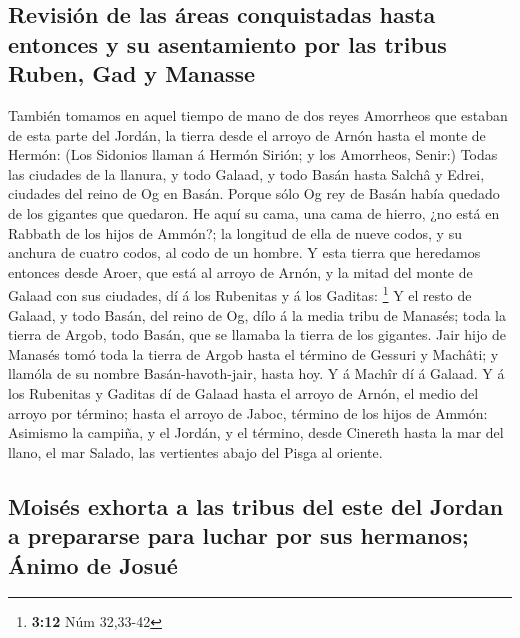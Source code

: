 \hypertarget{revisiuxf3n-de-las-uxe1reas-conquistadas-hasta-entonces-y-su-asentamiento-por-las-tribus-ruben-gad-y-manasse}{%
\subsection{Revisión de las áreas conquistadas hasta entonces y su
asentamiento por las tribus Ruben, Gad y
Manasse}\label{revisiuxf3n-de-las-uxe1reas-conquistadas-hasta-entonces-y-su-asentamiento-por-las-tribus-ruben-gad-y-manasse}}

 También tomamos en aquel tiempo de mano de dos reyes
Amorrheos que estaban de esta parte del Jordán, la tierra desde el
arroyo de Arnón hasta el monte de Hermón:  (Los Sidonios
llaman á Hermón Sirión; y los Amorrheos, Senir:)  Todas las
ciudades de la llanura, y todo Galaad, y todo Basán hasta Salchâ y
Edrei, ciudades del reino de Og en Basán.  Porque sólo Og
rey de Basán había quedado de los gigantes que quedaron. He aquí su
cama, una cama de hierro, ¿no está en Rabbath de los hijos de Ammón?; la
longitud de ella de nueve codos, y su anchura de cuatro codos, al codo
de un hombre.  Y esta tierra que heredamos entonces desde
Aroer, que está al arroyo de Arnón, y la mitad del monte de Galaad con
sus ciudades, dí á los Rubenitas y á los Gaditas: \footnote{\textbf{3:12}
  Núm 32,33-42}  Y el resto de Galaad, y todo Basán, del
reino de Og, dílo á la media tribu de Manasés; toda la tierra de Argob,
todo Basán, que se llamaba la tierra de los gigantes.  Jair
hijo de Manasés tomó toda la tierra de Argob hasta el término de Gessuri
y Machâti; y llamóla de su nombre Basán-havoth-jair, hasta hoy.
 Y á Machîr dí á Galaad.  Y á los Rubenitas y
Gaditas dí de Galaad hasta el arroyo de Arnón, el medio del arroyo por
término; hasta el arroyo de Jaboc, término de los hijos de Ammón:
 Asimismo la campiña, y el Jordán, y el término, desde
Cinereth hasta la mar del llano, el mar Salado, las vertientes abajo del
Pisga al oriente.

\hypertarget{moisuxe9s-exhorta-a-las-tribus-del-este-del-jordan-a-prepararse-para-luchar-por-sus-hermanos-uxe1nimo-de-josuuxe9}{%
\subsection{Moisés exhorta a las tribus del este del Jordan a prepararse
para luchar por sus hermanos; Ánimo de
Josué}\label{moisuxe9s-exhorta-a-las-tribus-del-este-del-jordan-a-prepararse-para-luchar-por-sus-hermanos-uxe1nimo-de-josuuxe9}}


